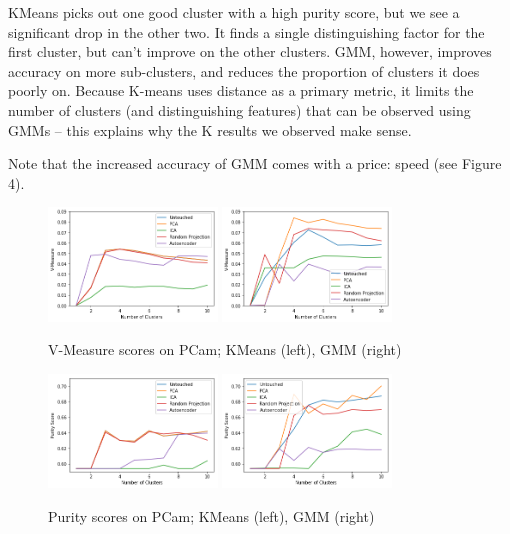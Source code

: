 \documentclass[letter]{article}
\begin{document}
KMeans picks out one good cluster with a high purity score, but we see a significant drop in the other two. It finds a single distinguishing factor for the first cluster, but can't improve on the other clusters. GMM, however, improves accuracy on more sub-clusters, and reduces the proportion of clusters it does poorly on. Because K-means uses distance as a primary metric, it limits the number of clusters (and distinguishing features) that can be observed using GMMs -- this explains why the K results we observed make sense.

Note that the increased accuracy of GMM comes with a price: speed (see Figure 4).

\begin{figure}
  \centering
  \includegraphics[width=0.4\textwidth]{images/pcamKmeansHomo.png}
  \includegraphics[width=0.4\textwidth]{images/pcamGMMHomo.png}
  \caption{V-Measure scores on PCam; KMeans (left), GMM (right)}
\end{figure}

\begin{figure}
  \centering
  \includegraphics[width=0.4\textwidth]{images/pcamKmeansPurity.png}
  \includegraphics[width=0.4\textwidth]{images/pcamGMMPurity.png}
  \caption{Purity scores on PCam; KMeans (left), GMM (right)}
\end{figure}
\end{document}
